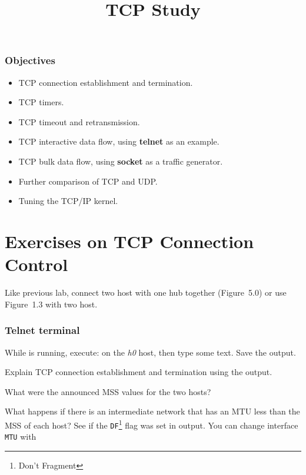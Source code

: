 \documentclass{../UTNetLab}
\title{TCP Study}
\begin{document}
\section*{Objectives}
\begin{itemize}
    \item TCP connection establishment and termination.
    \item TCP timers.
    \item TCP timeout and retransmission.
    \item TCP interactive data flow, using \textbf{telnet} as an example.
    \item TCP bulk data flow, using \textbf{socket} as a traffic generator.
    \item Further comparison of TCP and UDP.
    \item Tuning the TCP/IP kernel.
\end{itemize}

\part{Exercises on TCP Connection Control}
Like previous lab, connect two host with one hub together (Figure~5.0) or use Figure~1.3 with two host.

\section{Telnet terminal}
While  is running, execute:  on the \textit{h0} host, then type some text.
Save the  output.

\begin{report}
    \item Explain TCP connection establishment and termination using the  output.

    \item What were the announced MSS values for the two hosts?

    \item What happens if there is an intermediate network that has an MTU less than the MSS of each host?
    See if the \texttt{DF}\footnote{Don't Fragment} flag was set in  output.
    You can change interface \texttt{MTU} with 
\end{report}
\end{document}
